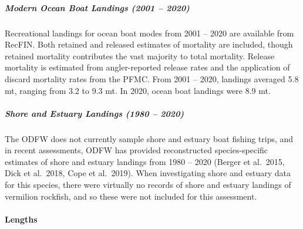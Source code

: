 \documentclass[11pt,
  english,
  a4paper,
]{article}
\begin{document}
\hypertarget{modern-ocean-boat-landings-2001-2020}{%
\subparagraph{Modern Ocean Boat Landings (2001 -- 2020)}\label{modern-ocean-boat-landings-2001-2020}}

\leavevmode\tagmcend\tagstructend


Recreational landings for ocean boat modes from 2001 -- 2020 are available from RecFIN. Both retained and released estimates of mortality are included, though retained mortality contributes the vast majority to total mortality. Release mortality is estimated from angler-reported release rates and the application of discard mortality rates from the PFMC. From 2001 -- 2020, landings averaged 5.8 mt, ranging from 3.2 to 9.3 mt. In 2020, ocean boat landings were 8.9 mt.

\leavevmode\tagmcend\tagstructend\par


\hypertarget{shore-and-estuary-landings-1980-2020}{%
\subparagraph{Shore and Estuary Landings (1980 -- 2020)}\label{shore-and-estuary-landings-1980-2020}}

\leavevmode\tagmcend\tagstructend


The ODFW does not currently sample shore and estuary boat fishing trips, and in recent assessments, ODFW has provided reconstructed species-specific estimates of shore and estuary landings from 1980 -- 2020 (Berger et al.~2015, Dick et al.~2018, Cope et al.~2019). When investigating shore and estuary data for this species, there were virtually no records of shore and estuary landings of vermilion rockfish, and so these were not included for this assessment.

\leavevmode\tagmcend\tagstructend\par


\hypertarget{lengths-1}{%
\paragraph{Lengths}\label{lengths-1}}

\leavevmode\tagmcend\tagstructend

\end{document}
